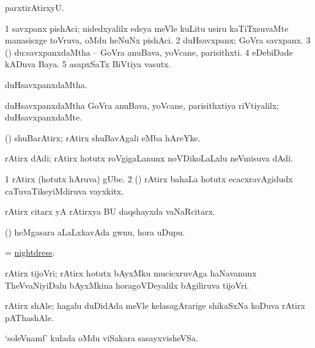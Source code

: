 \bentry
{}
\gl{\kirxvi}
\bmng
parxtirAtirxyU. 
\emng
\eentry

\bentry
{}
\gl{\nA}
\bmng
\bnum
\num{1} savxpanx pishAci; nidedxyalilx edeya meVle kuLitu usiru kaTiTxsuvaMte manasisxge toVruva, oMdu heNuNx pishAci. 
\num{2} duHsavxpanx; GoVra savxpanx. 
\num{3} (\AmA) du:savxpanxdaMtha -- GoVra anuBava, yoVcane, parisithxti. 
\num{4} eDebiDade kADuva Baya. 
\num{5} asapxSaTx BiVtiya vasutx. 
\enum
\emng
\eentry

\bentry
{}
\gl{\gu}
\bmng
duHsavxpanxdaMtha. 
\emng
\eentry

\bentry
{}
\gl{\kirxvi}
\bmng
duHsavxpanxdaMtha GoVra anuBava, yoVcane, parisithxtiya riVtiyalilx; duHsavxpanxdaMte. 
\emng
\eentry

\bentry
{}
\gl{\nA}
\bmng
(\AmA) shuBarAtirx; rAtirx shuBavAgali eMba hAreYke. 
\emng
\eentry

\bentry
{}
\gl{\nA}
\bmng
rAtirx dAdi; rAtirx hotutx roVgigaLanunx noVDikoLaLxlu neVmisuva dAdi. 
\emng
\eentry

\bentry
{}
\gl{\nA}
\bmng
\bnum
\num{1} rAtirx (hotutx hAruva) gUbe. 
\num{2} (\AmA) rAtirx bahaLa hotutx ecacxravAgidudx caTuvaTikeyiMdiruva vayxkitx. 
\enum
\emng
\eentry

\bentry
{}
\gl{\nA}
\bmng
rAtirx citarx yA rAtirxya BU daqshayxda vaNaRcitarx. 
\emng
\eentry

\bentry
{}
\gl{\nA}
\bmng
(\ca) heMgasara aLaLxkavAda gwnu, hora uDupu. 
\emng
\eentry

\bentry
{}
\gl{\nA}
\bmng
= \hyperlink{nightdress}{nightdress}. 
\emng
\eentry

\bentry
{}
\gl{\nA}
\bmng
rAtirx tijoVri; rAtirx hotutx bAyxMku mucicxruvAga haNavanunx TheVvaNiyiDalu bAyxMkina horagoVDeyalilx bAgiliruva tijoVri. 
\emng
\eentry

\bentry
{}
\gl{\nA}
\bmng
rAtirx shAle; hagalu duDidAda meVle kelasagArarige shikaSxNa koDuva rAtirx pAThashAle. 
\emng
\eentry

\bentry
{}
\gl{\nA}
\bmng
`soleVnamf' kulada oMdu viSakara sasayxvisheVSa. 
\emng

